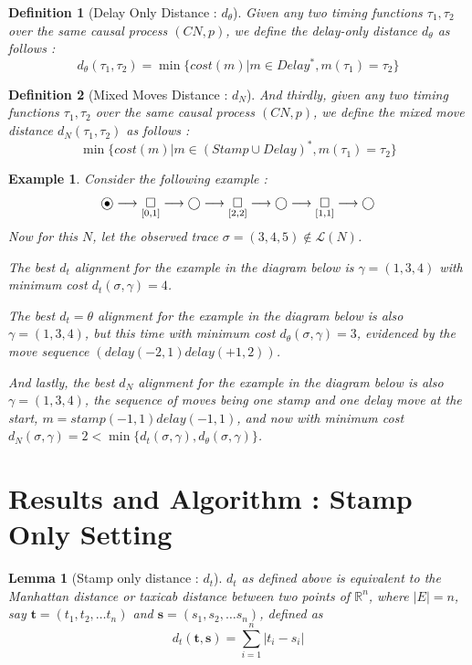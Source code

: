 \documentclass[conference]{IEEEtran}
\newcommand\eye{\ensurestackMath{\stackinset{c}{}{c}{-.33pt}%
		{\bullet}{\bigcirc}}}
\newtheorem{lemma}[theorem]{Lemma}
\newtheorem{definition}{Definition}
\newtheorem{example}{Example}
\begin{document}
	\begin{definition}[Delay Only Distance : $d_\theta$]
		Given any two timing functions $\tau_1, \tau_2$ over the same causal process $(CN, p)$, we define the delay-only distance $d_\theta$ as follows : 
		$$d_\theta(\tau_1, \tau_2) = \min \{cost(m) | {m \in Delay^*}, {m(\tau_1) = \tau_2}\}$$
	\end{definition}
	
	\begin{definition}[Mixed Moves Distance : $d_N$]
		And thirdly, given any two timing functions $\tau_1, \tau_2$ over the same causal process $(CN, p)$, we define the mixed move distance $d_N(\tau_1, \tau_2)$ as follows : 
		$$\min \{cost(m) | {m \in (Stamp\cup Delay)^*}, {m(\tau_1) = \tau_2}\}$$
	\end{definition} 
	
	\begin{example}\label{stamptoy}
		Consider the following example : 
		$$\eye \longrightarrow \underset{[0,1]}{\square} \longrightarrow \bigcirc \longrightarrow \underset{[2,2]}{\square} \longrightarrow \bigcirc \longrightarrow \underset{[1,1]}{\square} \longrightarrow \bigcirc$$
		Now for this $N$, let the observed trace ${\sigma = (3, 4, 5) \not \in \mathcal{L}(N)}$. 
		
		The best $d_t$ alignment for the example in the diagram below is $\gamma = (1,3,4)$ with minimum cost $d_t(\sigma, \gamma) = 4$. 
		
		The best $d_t=\theta$ alignment for the example in the diagram below is also $\gamma = (1,3,4)$, but this time with minimum cost $d_\theta(\sigma, \gamma) = 3$, evidenced by the move sequence $(delay(-2, 1)delay(+1, 2))$. 
		
		And lastly, the best $d_N$ alignment for the example in the diagram below is also $\gamma = (1,3,4)$, the sequence of moves being one stamp and one delay move at the start, $m = stamp(-1, 1)delay(-1, 1)$, and now with minimum cost $d_N(\sigma, \gamma) = 2 < \min \{d_t(\sigma, \gamma), d_\theta(\sigma, \gamma)\}$. 
	\end{example}
	
	
	\section{Results and Algorithm : Stamp Only Setting}
	\begin{lemma}[Stamp only distance : $d_t$]\label{manhattan}
		$d_t$ as defined above is equivalent to the \textit{Manhattan distance} or \textit{taxicab distance} between two points of $\mathbb{R}^n$, where $|E| = n$, say $\mathbf{t} = (t_1, t_2, \dots t_n) $ and $\mathbf{s} = (s_1, s_2, \dots s_n)$, defined as $$d_t(\mathbf{t}, \mathbf{s}) = \sum_{i = 1}^{n} |t_i - s_i|$$
	\end{lemma}
	
\end{document}
